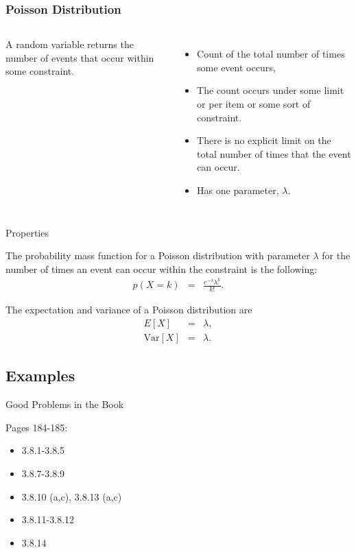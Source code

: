 \begin{frame}
  \frametitle{Poisson Distribution}

  \begin{columns}
    \begin{definition}
      A  random variable returns the number of events
      that occur within some constraint.
    \end{definition}
      \begin{itemize}
      \item Count of the total number of times some event occurs,
      \item The count occurs under some limit or per item or some sort
        of constraint.
      \item There is no explicit limit on the total number of times
        that the event can occur.
      \item Has one parameter, $\lambda$.
      \end{itemize}
  \end{columns}

\end{frame}

\begin{frame}{Properties}

  The probability mass function for a Poisson distribution with
  parameter $\lambda$ for the number of times an event can occur
  within the constraint is the following:
  \begin{eqnarray*}
    p(X=k) & = & \frac{e^{-\lambda}\lambda^k}{k!}.
  \end{eqnarray*}

  The expectation and variance of a Poisson distribution are
  \begin{eqnarray*}
    E[X] & = & \lambda, \\
    \mathrm{Var}[X] & = & \lambda.
  \end{eqnarray*}

\end{frame}


\subsection{Examples}

\begin{frame}{Good Problems in the Book}

  \vfill 
  Pages 184-185:
  \begin{itemize}
  \item 3.8.1-3.8.5
  \item 3.8.7-3.8.9
  \item 3.8.10 (a,c), 3.8.13 (a,c)
  \item 3.8.11-3.8.12
  \item 3.8.14
  \end{itemize}
  \vfill
  
\end{frame}



